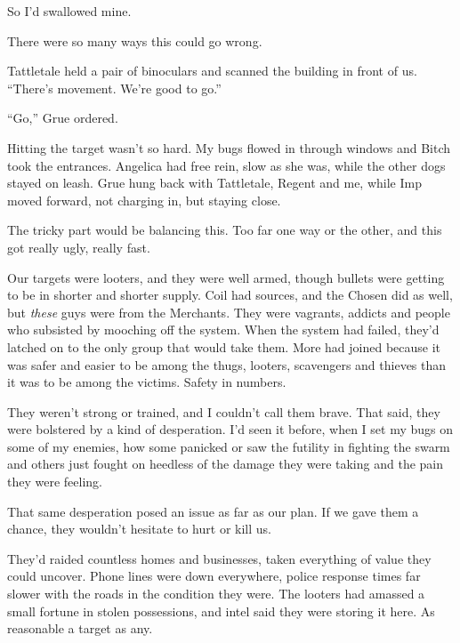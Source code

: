 So I'd swallowed mine.



\blacksquare






There were so many ways this could go wrong.



Tattletale held a pair of binoculars and scanned the building in front of us.  ``There's movement.  We're good to go.''



``Go,'' Grue ordered.



Hitting the target wasn't so hard.  My bugs flowed in through windows and Bitch took the entrances.  Angelica had free rein, slow as she was, while the other dogs stayed on leash.  Grue hung back with Tattletale, Regent and me, while Imp moved forward, not charging in, but staying close.



The tricky part would be balancing this.  Too far one way or the other, and this got really ugly, really fast.



Our targets were looters, and they were well armed, though bullets were getting to be in shorter and shorter supply.  Coil had sources, and the Chosen did as well, but \emph{these} guys were from the Merchants.  They were vagrants, addicts and people who subsisted by mooching off the system.  When the system had failed, they'd latched on to the only group that would take them.  More had joined because it was safer and easier to be among the thugs, looters, scavengers and thieves than it was to be among the victims.  Safety in numbers.



They weren't strong or trained, and I couldn't call them brave.  That said, they were bolstered by a kind of desperation.  I'd seen it before, when I set my bugs on some of my enemies, how some panicked or saw the futility in fighting the swarm and others just fought on heedless of the damage they were taking and the pain they were feeling.



That same desperation posed an issue as far as our plan.  If we gave them a chance, they wouldn't hesitate to hurt or kill us.



They'd raided countless homes and businesses, taken everything of value they could uncover.  Phone lines were down everywhere, police response times far slower with the roads in the condition they were.  The looters had amassed a small fortune in stolen possessions, and intel said they were storing it here.  As reasonable a target as any.



